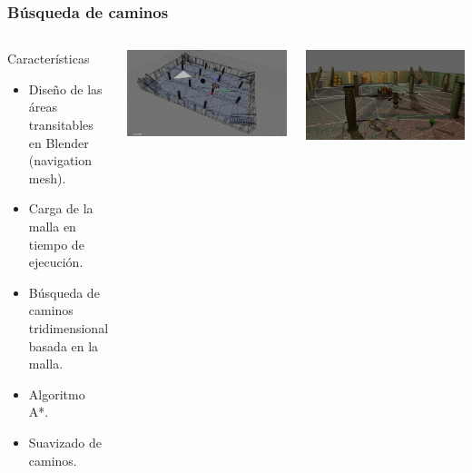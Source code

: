 \documentclass[green]{beamer}
\begin{document}
\begin{frame}
\transdissolve
    \frametitle{Búsqueda de caminos}
    
    \begin{columns}[t]
    \column{150pt}
        
	\scriptsize{
	\begin{block}{Características}
            \begin{itemize}
                \item Diseño de las áreas transitables en Blender (navigation mesh).
		\item Carga de la malla en tiempo de ejecución.
		\item Búsqueda de caminos tridimensional basada en la malla.
		\item Algoritmo A*.
		\item Suavizado de caminos.
            \end{itemize}            
        \end{block}
	}

    \column{150pt}
	
	\begin{center}
	    \includegraphics[scale=0.115]{img/navigation-mesh-design.jpg}
	\end{center}
	
	\begin{center}
	    \includegraphics[scale=0.1]{img/navigation-mesh-demo.jpg}
	\end{center}
	
    \end{columns} 
\end{frame}
\end{document}
